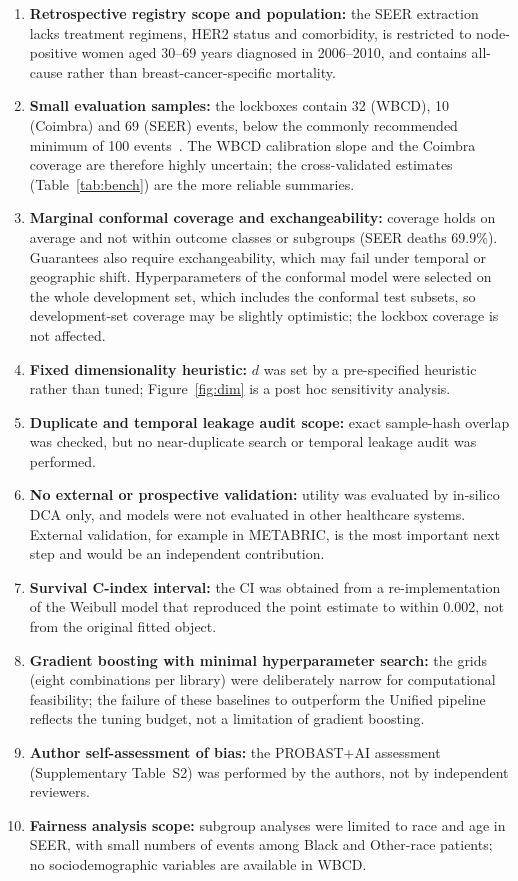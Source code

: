 \documentclass[11pt,a4paper]{article}
\begin{document}
\begin{enumerate}[leftmargin=*]
\item \textbf{Retrospective registry scope and population:} the SEER extraction lacks treatment regimens, HER2 status and comorbidity, is restricted to node-positive women aged 30--69 years diagnosed in 2006--2010, and contains all-cause rather than breast-cancer-specific mortality.
\item \textbf{Small evaluation samples:} the lockboxes contain 32 (WBCD), 10 (Coimbra) and 69 (SEER) events, below the commonly recommended minimum of 100 events~\cite{collins2016,riley2021val}. The WBCD calibration slope and the Coimbra coverage are therefore highly uncertain; the cross-validated estimates (Table~\ref{tab:bench}) are the more reliable summaries.
\item \textbf{Marginal conformal coverage and exchangeability:} coverage holds on average and not within outcome classes or subgroups (SEER deaths 69.9\%). Guarantees also require exchangeability, which may fail under temporal or geographic shift. Hyperparameters of the conformal model were selected on the whole development set, which includes the conformal test subsets, so development-set coverage may be slightly optimistic; the lockbox coverage is not affected.
\item \textbf{Fixed dimensionality heuristic:} $d$ was set by a pre-specified heuristic rather than tuned; Figure~\ref{fig:dim} is a post hoc sensitivity analysis.
\item \textbf{Duplicate and temporal leakage audit scope:} exact sample-hash overlap was checked, but no near-duplicate search or temporal leakage audit was performed.
\item \textbf{No external or prospective validation:} utility was evaluated by in-silico DCA only, and models were not evaluated in other healthcare systems. External validation, for example in METABRIC, is the most important next step and would be an independent contribution.
\item \textbf{Survival C-index interval:} the CI was obtained from a re-implementation of the Weibull model that reproduced the point estimate to within 0.002, not from the original fitted object.
\item \textbf{Gradient boosting with minimal hyperparameter search:} the grids (eight combinations per library) were deliberately narrow for computational feasibility; the failure of these baselines to outperform the Unified pipeline reflects the tuning budget, not a limitation of gradient boosting.
\item \textbf{Author self-assessment of bias:} the PROBAST+AI assessment (Supplementary Table~S2) was performed by the authors, not by independent reviewers.
\item \textbf{Fairness analysis scope:} subgroup analyses were limited to race and age in SEER, with small numbers of events among Black and Other-race patients; no sociodemographic variables are available in WBCD.
\end{enumerate}
\end{document}
